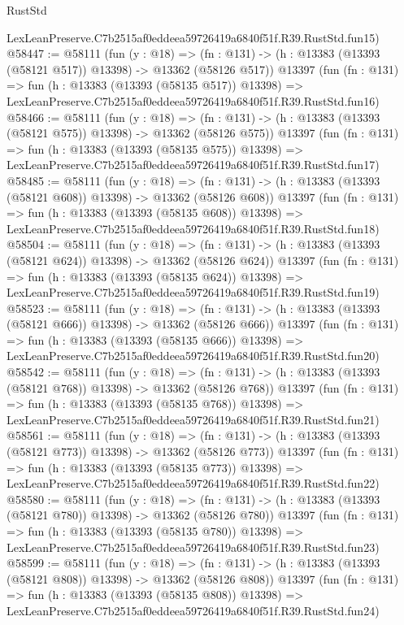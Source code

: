\begin{lexlean}{RustStd}
\begin{coremodule}
    LexLeanPreserve.C7b2515af0eddeea59726419a6840f51f.R39.RustStd.fun15)
@58447 := @58111
    (fun (y : @18) =>
    (fn : @131) -> (h : @13383 (@13393 (@58121 @517)) @13398) -> @13362 (@58126 @517))
    @13397
    (fun (fn : @131) =>
    fun (h : @13383 (@13393 (@58135 @517)) @13398) =>
    LexLeanPreserve.C7b2515af0eddeea59726419a6840f51f.R39.RustStd.fun16)
@58466 := @58111
    (fun (y : @18) =>
    (fn : @131) -> (h : @13383 (@13393 (@58121 @575)) @13398) -> @13362 (@58126 @575))
    @13397
    (fun (fn : @131) =>
    fun (h : @13383 (@13393 (@58135 @575)) @13398) =>
    LexLeanPreserve.C7b2515af0eddeea59726419a6840f51f.R39.RustStd.fun17)
@58485 := @58111
    (fun (y : @18) =>
    (fn : @131) -> (h : @13383 (@13393 (@58121 @608)) @13398) -> @13362 (@58126 @608))
    @13397
    (fun (fn : @131) =>
    fun (h : @13383 (@13393 (@58135 @608)) @13398) =>
    LexLeanPreserve.C7b2515af0eddeea59726419a6840f51f.R39.RustStd.fun18)
@58504 := @58111
    (fun (y : @18) =>
    (fn : @131) -> (h : @13383 (@13393 (@58121 @624)) @13398) -> @13362 (@58126 @624))
    @13397
    (fun (fn : @131) =>
    fun (h : @13383 (@13393 (@58135 @624)) @13398) =>
    LexLeanPreserve.C7b2515af0eddeea59726419a6840f51f.R39.RustStd.fun19)
@58523 := @58111
    (fun (y : @18) =>
    (fn : @131) -> (h : @13383 (@13393 (@58121 @666)) @13398) -> @13362 (@58126 @666))
    @13397
    (fun (fn : @131) =>
    fun (h : @13383 (@13393 (@58135 @666)) @13398) =>
    LexLeanPreserve.C7b2515af0eddeea59726419a6840f51f.R39.RustStd.fun20)
@58542 := @58111
    (fun (y : @18) =>
    (fn : @131) -> (h : @13383 (@13393 (@58121 @768)) @13398) -> @13362 (@58126 @768))
    @13397
    (fun (fn : @131) =>
    fun (h : @13383 (@13393 (@58135 @768)) @13398) =>
    LexLeanPreserve.C7b2515af0eddeea59726419a6840f51f.R39.RustStd.fun21)
@58561 := @58111
    (fun (y : @18) =>
    (fn : @131) -> (h : @13383 (@13393 (@58121 @773)) @13398) -> @13362 (@58126 @773))
    @13397
    (fun (fn : @131) =>
    fun (h : @13383 (@13393 (@58135 @773)) @13398) =>
    LexLeanPreserve.C7b2515af0eddeea59726419a6840f51f.R39.RustStd.fun22)
@58580 := @58111
    (fun (y : @18) =>
    (fn : @131) -> (h : @13383 (@13393 (@58121 @780)) @13398) -> @13362 (@58126 @780))
    @13397
    (fun (fn : @131) =>
    fun (h : @13383 (@13393 (@58135 @780)) @13398) =>
    LexLeanPreserve.C7b2515af0eddeea59726419a6840f51f.R39.RustStd.fun23)
@58599 := @58111
    (fun (y : @18) =>
    (fn : @131) -> (h : @13383 (@13393 (@58121 @808)) @13398) -> @13362 (@58126 @808))
    @13397
    (fun (fn : @131) =>
    fun (h : @13383 (@13393 (@58135 @808)) @13398) =>
    LexLeanPreserve.C7b2515af0eddeea59726419a6840f51f.R39.RustStd.fun24)

\end{coremodule}
\end{lexlean}
